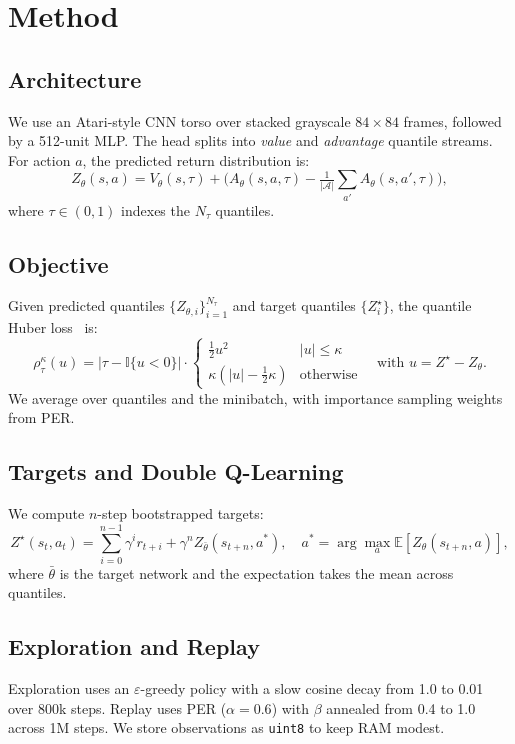\documentclass[11pt]{article}
\begin{document}
\section{Method}
\subsection{Architecture}
We use an Atari-style CNN torso over stacked grayscale $84\times84$ frames, followed by a 512-unit MLP. The head splits into \emph{value} and \emph{advantage} quantile streams. For action $a$, the predicted return distribution is:
\[
Z_\theta(s,a) = V_\theta(s,\tau) + \big(A_\theta(s,a,\tau) - \tfrac{1}{|\mathcal{A}|}\sum_{a'}A_\theta(s,a',\tau)\big),
\]
where $\tau \in (0,1)$ indexes the $N_\tau$ quantiles.

\subsection{Objective}
Given predicted quantiles $\{Z_{\theta,i}\}_{i=1}^{N_\tau}$ and target quantiles $\{Z^{\star}_i\}$, the quantile Huber loss~\cite{dabney2018qr} is:
\[
\rho_\tau^\kappa(u) =
|\tau - \mathbb{I}\{u<0\}| \cdot
\begin{cases}
\frac{1}{2}u^2 & |u|\le \kappa\\
\kappa(|u| - \frac{1}{2}\kappa) & \text{otherwise}
\end{cases}
\quad\text{with } u = Z^{\star} - Z_{\theta}.
\]
We average over quantiles and the minibatch, with importance sampling weights from PER.

\subsection{Targets and Double Q-Learning}
We compute $n$-step bootstrapped targets:
\[
Z^{\star}(s_t,a_t) = \sum_{i=0}^{n-1} \gamma^i r_{t+i} + \gamma^n Z_{\bar{\theta}}(s_{t+n}, a^\ast), \quad
a^\ast = \arg\max_{a} \mathbb{E}[Z_\theta(s_{t+n},a)],
\]
where $\bar{\theta}$ is the target network and the expectation takes the mean across quantiles.

\subsection{Exploration and Replay}
Exploration uses an $\varepsilon$-greedy policy with a slow cosine decay from 1.0 to 0.01 over 800k steps. Replay uses PER ($\alpha=0.6$) with $\beta$ annealed from 0.4 to 1.0 across 1M steps. We store observations as \texttt{uint8} to keep RAM modest.
\end{document}
